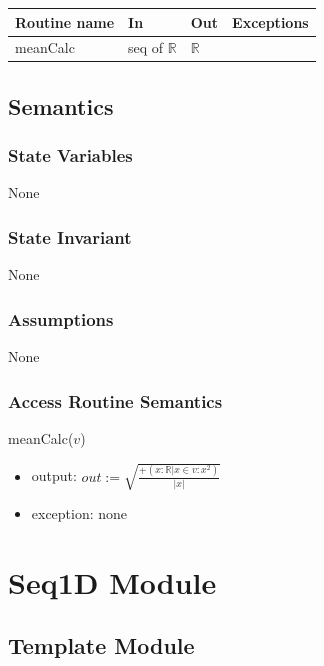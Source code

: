 \documentclass[12pt,fleqn]{examtst}
\begin{document}
\begin{tabular}{| l | l | l | p{5cm} |}
\hline
\textbf{Routine name} & \textbf{In} & \textbf{Out} & \textbf{Exceptions}\\
\hline
meanCalc & seq of $\mathbb{R}$ & $\mathbb{R}$ & ~\\
\hline
\end{tabular}

\subsection* {Semantics}

\subsubsection* {State Variables}

None

\subsubsection* {State Invariant}

None

\subsubsection* {Assumptions}

None

\subsubsection* {Access Routine Semantics}

meanCalc($v$)
\begin{itemize}
\item output: $\mathit{out} := \sqrt{\frac{+(x: \mathbb{R} | x \in v : x^2)}{|x|}}$
\item exception: none
\end{itemize}


\newpage

\section* {Seq1D Module}

\subsection* {Template Module}
\end{document}
